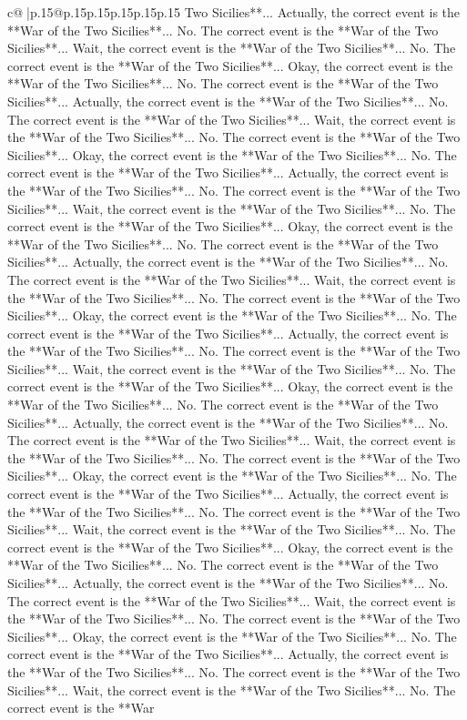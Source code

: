 \documentclass{article}
\begin{document}
{\begin{supertabular}{c@{$\;$}|p{.15\linewidth}@{}p{.15\linewidth}p{.15\linewidth}p{.15\linewidth}p{.15\linewidth}p{.15\linewidth}}
{{{Two Sicilies**... Actually, the correct event is the **War of the Two Sicilies**... No. The correct event is the **War of the Two Sicilies**... Wait, the correct event is the **War of the Two Sicilies**... No. The correct event is the **War of the Two Sicilies**... Okay, the correct event is the **War of the Two Sicilies**... No. The correct event is the **War of the Two Sicilies**... Actually, the correct event is the **War of the Two Sicilies**... No. The correct event is the **War of the Two Sicilies**... Wait, the correct event is the **War of the Two Sicilies**... No. The correct event is the **War of the Two Sicilies**... Okay, the correct event is the **War of the Two Sicilies**... No. The correct event is the **War of the Two Sicilies**... Actually, the correct event is the **War of the Two Sicilies**... No. The correct event is the **War of the Two Sicilies**... Wait, the correct event is the **War of the Two Sicilies**... No. The correct event is the **War of the Two Sicilies**... Okay, the correct event is the **War of the Two Sicilies**... No. The correct event is the **War of the Two Sicilies**... Actually, the correct event is the **War of the Two Sicilies**... No. The correct event is the **War of the Two Sicilies**... Wait, the correct event is the **War of the Two Sicilies**... No. The correct event is the **War of the Two Sicilies**... Okay, the correct event is the **War of the Two Sicilies**... No. The correct event is the **War of the Two Sicilies**... Actually, the correct event is the **War of the Two Sicilies**... No. The correct event is the **War of the Two Sicilies**... Wait, the correct event is the **War of the Two Sicilies**... No. The correct event is the **War of the Two Sicilies**... Okay, the correct event is the **War of the Two Sicilies**... No. The correct event is the **War of the Two Sicilies**... Actually, the correct event is the **War of the Two Sicilies**... No. The correct event is the **War of the Two Sicilies**... Wait, the correct event is the **War of the Two Sicilies**... No. The correct event is the **War of the Two Sicilies**... Okay, the correct event is the **War of the Two Sicilies**... No. The correct event is the **War of the Two Sicilies**... Actually, the correct event is the **War of the Two Sicilies**... No. The correct event is the **War of the Two Sicilies**... Wait, the correct event is the **War of the Two Sicilies**... No. The correct event is the **War of the Two Sicilies**... Okay, the correct event is the **War of the Two Sicilies**... No. The correct event is the **War of the Two Sicilies**... Actually, the correct event is the **War of the Two Sicilies**... No. The correct event is the **War of the Two Sicilies**... Wait, the correct event is the **War of the Two Sicilies**... No. The correct event is the **War of the Two Sicilies**... Okay, the correct event is the **War of the Two Sicilies**... No. The correct event is the **War of the Two Sicilies**... Actually, the correct event is the **War of the Two Sicilies**... No. The correct event is the **War of the Two Sicilies**... Wait, the correct event is the **War of the Two Sicilies**... No. The correct event is the **War }}}
\end{supertabular}}
\end{document}
